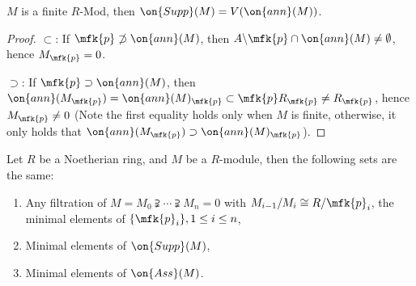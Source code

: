 \begin{thm}
	$M$ is a finite $R$-Mod, then $\on{Supp}(M)=V(\on{ann}(M))$.
\end{thm}
\begin{proof}
	$\subset$: If $\mfk{p}\not\supset\on{ann}(M)$, then $A\backslash\mfk{p}\cap\on{ann}(M)\neq\emptyset$, hence $M_\mfk{p}=0$.
	
	$\supset$: If $\mfk{p}\supset\on{ann}(M)$, then $\on{ann}(M_\mfk{p})=\on{ann}(M)_\mfk{p}\subset\mfk{p}R_\mfk{p}\neq R_\mfk{p}$, hence $M_\mfk{p}\neq 0$ (Note the first equality holds only when $M$ is finite, otherwise, it only holds that $\on{ann}(M_\mfk{p})\supset\on{ann}(M)_\mfk{p}$).
\end{proof}

\begin{thm}\label{minimal}
	Let $R$ be a Noetherian ring, and $M$ be a $R$-module, then the following sets are the same:
	\begin{enumerate}
		\item Any filtration of $M=M_0\supsetneqq\cdots\supsetneqq M_n=0$ with $M_{i-1}/M_{i}\cong R/\mfk{p}_i$, the minimal elements of $\{\mfk{p}_i\}, 1\leq i\leq n$,
		\item Minimal elements of $\on{Supp}(M)$,
		\item Minimal elements of $\on{Ass}(M)$.
	\end{enumerate}
\end{thm}
